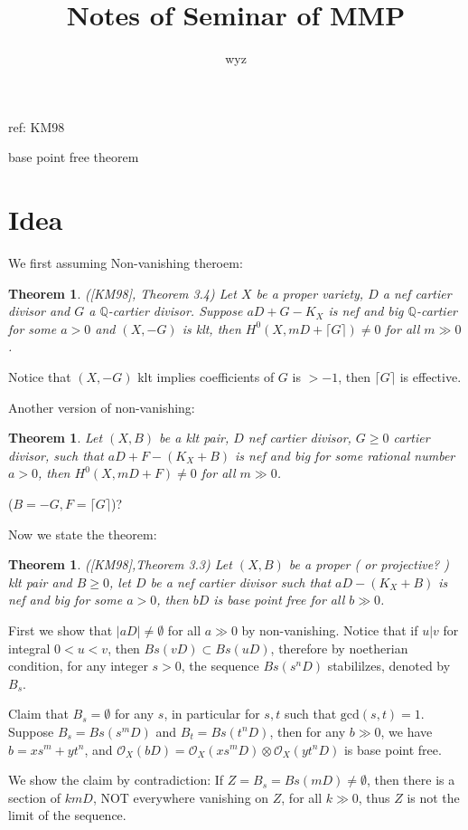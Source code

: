 \documentclass{article}
\title{Notes of Seminar of MMP}
\author{wyz}
\date{}
\newtheorem{thm}[defn]{Theorem}
\begin{document}

ref: KM98

base point free theorem


\section{Idea}
We first assuming Non-vanishing theroem:
\begin{thm}
	([KM98], Theorem 3.4) Let $ X $ be a proper variety, $ D $ a nef cartier divisor and $ G $ a $ \mathbb{Q} $-cartier divisor. Suppose $ aD+G-K_X $ is nef and big $ \mathbb{Q} $-cartier for some $ a>0 $ and $ (X,-G) $ is klt, then $ H^0(X,mD+\lceil G \rceil)\neq 0 $ for all $ m\gg 0 $.
\end{thm}
Notice that $ (X,-G) $ klt implies coefficients of $ G $ is $ >-1 $, then $ \lceil G\rceil $ is effective.

Another version of non-vanishing:
\begin{thm}
	Let $ (X,B) $ be a klt pair, $ D $ nef cartier divisor, $ G\geqslant0 $ cartier divisor, such that $ aD+F-(K_X+B) $ is nef and big for some rational number $ a>0 $, then $ H^0(X,mD+F)\neq 0 $ for all $ m\gg 0 $.
\end{thm}
($ B=-G, F=\lceil G\rceil $)?

Now we state the theorem:
\begin{thm}
	([KM98],Theorem 3.3) Let $ (X,B) $ be a proper ( or projective? ) klt pair and $ B\geqslant 0 $, let $ D $ be a nef cartier divisor such that $ aD-(K_X+B) $ is nef and big for some $ a>0 $, then $ bD $ is base point free for all $ b\gg 0 $.
\end{thm}
First we show that $ |aD| \neq \emptyset $ for all $ a\gg 0 $ by non-vanishing. Notice that if $ u|v $ for integral $ 0<u<v $, then $ Bs(vD)\subset Bs(uD) $, therefore by noetherian condition, for any  integer $ s>0 $, the sequence $ Bs(s^nD) $ stabililzes, denoted by $ B_s $.

Claim that $ B_s=\emptyset $ for any $ s $, in particular for $ s,t $ such that $ \mathrm{gcd}(s,t)=1 $. Suppose $ B_s=Bs(s^mD) $ and $ B_t=Bs(t^nD) $, then for any $ b\gg 0$, we have $ b=xs^m+yt^n $, and $ \mathcal{O}_X(bD)=\mathcal{O}_X(xs^mD)\otimes\mathcal{O}_X(yt^nD) $ is base point free. 

We show the claim by contradiction: If $ Z=B_s=Bs(mD)\neq \emptyset $, then there is a section of $ kmD $, NOT everywhere vanishing on $ Z $, for all $ k\gg 0 $, thus $ Z $ is not the limit of the sequence. 
\end{document}

